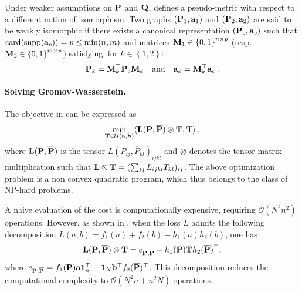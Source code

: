 \begin{remark}
    Under weaker assumptions on ${\mathbf{P}}$ and ${\mathbf{Q}}$,  defines a pseudo-metric with respect to a different notion of isomorphism. Two graphs $({\mathbf{P}}_1, {\mathbf{a}}_1)$ and $({\mathbf{P}}_2, {\mathbf{a}}_2)$ are said to be weakly isomorphic \citep{chowdhury2019gromov} if there exists a canonical representation $({\mathbf{P}}_c, {\mathbf{a}}_c)$ such that $\operatorname{card}(\operatorname{supp}({\mathbf{a}}_c)) = p \leq \min(n, m)$ and matrices ${\mathbf{M}}_1 \in \left\{0,1 \right\}^{n \times p}$ (resp. ${\mathbf{M}}_2 \in \left\{0,1 \right\}^{m \times p}$) satisfying, for $k \in \left\{1, 2\right\}$:
    \begin{equation}
        {\mathbf{P}}_k = {\mathbf{M}}_k^\top {\mathbf{P}}_c {\mathbf{M}}_k \quad \text{and} \quad {\mathbf{a}}_k = {\mathbf{M}}_k^\top {\mathbf{a}}_c \:.
    \end{equation}
\end{remark}


\paragraph{Solving Gromov-Wasserstein.} The objective in  can be expressed as 
\begin{align}
    \min_{{\mathbf{T}} \in {\mathcal{U}}({\mathbf{a}}, {\mathbf{b}})} \langle {\mathbf{L}}({\mathbf{P}}, \overline{{\mathbf{P}}}) \otimes {\mathbf{T}}, {\mathbf{T}} \rangle \:,
\end{align}
where ${\mathbf{L}}({\mathbf{P}}, \overline{{\mathbf{P}}})$ is the tensor $L(P_{ij}, \overline{P}_{kl})_{ijkl}$ and $\otimes$ denotes the tensor-matrix multiplication such that ${\mathbf{L}} \otimes {\mathbf{T}} = (\sum_{kl} L_{ijkl} T_{kl})_{ij}$. The above optimization problem is a non convex quadratic program, which thus belongs to the class of NP-hard problems. 

A naive evaluation of the cost is computationally expensive, requiring $\mathcal{O}(N^2n^2)$ operations. However, as shown in \citep{peyre2016gromov}, when the loss $L$ admits the following decomposition $L(a, b) = f_{1}(a) + f_{2}(b) - h_{1}(a) h_{2}(b)$, one has
\[
{\mathbf{L}}({\mathbf{P}}, \overline{{\mathbf{P}}}) \otimes {\mathbf{T}} = c_{{\mathbf{P}}, \overline{{\mathbf{P}}}} - h_1({\mathbf{P}}) {\mathbf{T}} h_2(\overline{{\mathbf{P}}})^\top,
\]
where $c_{{\mathbf{P}}, \overline{{\mathbf{P}}}} = f_1({\mathbf{P}}) {\mathbf{a}} \mathbf{1}_n^\top + \mathbf{1}_N {\mathbf{b}}^\top f_2(\overline{{\mathbf{P}}})^\top$. This decomposition reduces the computational complexity to $\mathcal{O}(N^2n + n^2N)$ operations.

